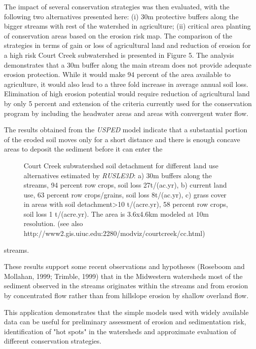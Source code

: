 \documentclass{kapedbk} %
\begin{document}
The impact of several conservation strategies was then evaluated,
with the following two alternatives presented here:
(i) 30m protective buffers along the bigger streams with rest of the
watershed in agriculture;
(ii) critical area planting of conservation areas based on the erosion risk map.
The comparison of the strategies in terms of gain or loss of
agricultural land and reduction of erosion for a high risk Court Creek 
subwatershed is presented in Figure 5. The analysis demonstrates that a 30m
buffer along the main stream does not provide adequate erosion
protection. While it would make 94 percent of the area available to
agriculture, it would also lead to a three fold increase in 
average annual soil loss.
Elimination of high erosion potential would require reduction
of agricultural land by only 5 percent and extension of the criteria
currently used for the conservation program by including the
headwater areas and areas with convergent water flow.

The results obtained from the {\sl USPED} model 
indicate that a substantial portion of the eroded soil moves
only for a short distance and there is enough concave areas
to deposit the sediment before it can enter the 

\begin{figure}[h]
\centerline{}
\caption{Court Creek subwatershed soil detachment
for different land use alternatives estimated by {\sl RUSLE3D}:
a) 30m buffers along the streams, 94 percent row crops, soil loss 27t/(ac.yr),
b) current land use, 63 percent row crops/grains, soil loss 8t/(ac.yr),
c) grass cover in areas with soil detachment>10 t/(acre.yr), 58 percent
 row crops, soil loss 1 t/(acre.yr).
The area is 3.6x4.6km modeled at 10m resolution.
(see also http://www2.gis.uiuc.edu:2280/modviz/courtcreek/cc.html)}
\end{figure}

\noindent
streams.

These results support some recent observations and
hypotheses (Roseboom and Mollahan, 1999; Trimble, 1999)
that in the Midwestern watersheds most of the sediment observed in the streams
originates within the streams and from erosion by concentrated flow
rather than from hillslope erosion by shallow overland flow.

This application demonstrates that the simple models used with
widely available data can be useful for preliminary assessment
of erosion and sedimentation risk, identification of "hot spots"
in the watersheds and approximate evaluation of different
conservation strategies.
\end{document}

